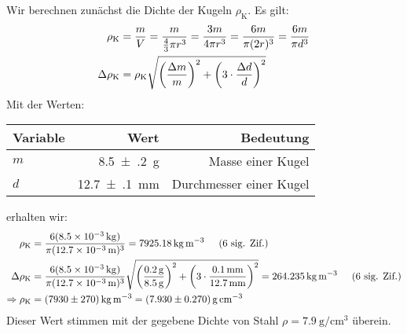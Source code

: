 		Wir berechnen zunächst die Dichte der Kugeln $\rho_\text{K}$. Es gilt:
		\begin{align} 
			\rhok &= \frac{m}{V} = \frac{m}{\frac{4}{3}\pi r^3} = \frac{3m}{4\pi r^3} = \frac{6m}{\pi (2r)^3} = \frac{6m}{\pi d^3}  \\
			\Delta \rhok &= \rhok \sqrt{
				\left(\frac{\Delta m}{m}\right)^2 +
				\left(3\cdot \frac{\Delta d}{d}\right)^2
			}
		\end{align}
		Mit der Werten:
		\begin{center}
			\begin{tabular}{lrr}
				\toprule
				Variable & Wert & Bedeutung \\
				\midrule
				$m$ & \SI{8.5(2)}{\gram} & Masse einer Kugel \\
				$d$ & \SI{12.7(1)}{\milli\meter} & Durchmesser einer Kugel \\
				\bottomrule
			\end{tabular}
		\end{center}
		erhalten wir:
		\begin{align}
			\rhok &= \frac{6(\SI{8.5e-3}{\kilo\gram})}{\pi (\SI{12.7e-3}{\meter})^3} = \SI{7925.18}{\kilogram\per\meter\cubed} \sigfig{6} \\
			\Delta \rhok &= \frac{6(\SI{8.5e-3}{\kilo\gram})}{\pi (\SI{12.7e-3}{\meter})^3} \sqrt{
				\left(\frac{\SI{0.2}{\gram}}{\SI{8.5}{\gram}}\right)^2 +
				\left(3\cdot\frac{\SI{0.1}{\milli\meter}}{\SI{12.7}{\milli\meter}}\right)^2
			} = \SI{264.235}{\kilogram\per\meter\cubed} \sigfig{6}\\
			\Rightarrow \rhok &= \SI{7930(270)}{\kilogram\per\meter\cubed} = \SI{7.930(270)}{\gram\per\centi\meter\cubed}
		\end{align}
		Dieser Wert stimmen mit der gegebene Dichte von Stahl $\rho = \SI{7.9}{\gram\per\centi\meter\cubed}$ überein.

